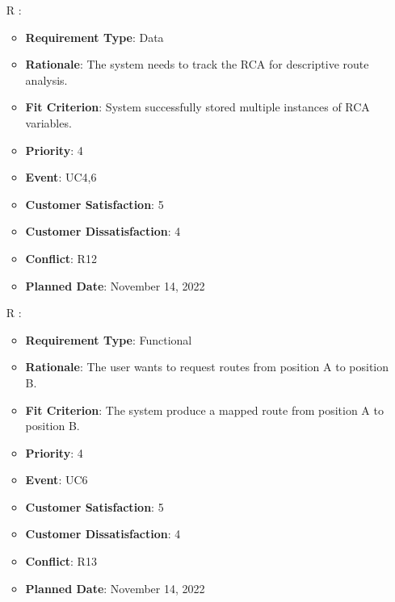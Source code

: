 \documentclass[12pt, titlepage]{article}
\newcounter{reqnum} %
\begin{document}
\begin{itemize}
\item[R\refstepcounter{reqnum}\thereqnum
\label{R_Inputs_1}:] 
\begin{itemize}
    \item \textbf{Requirement Type}: Data
    \item \textbf{Rationale}: The system needs to track the RCA for descriptive route analysis. 
    \item \textbf{Fit Criterion}: System successfully stored multiple instances of RCA variables. 
    \item \textbf{Priority}: 4
    \item \textbf{Event}: UC4,6
    \item \textbf{Customer Satisfaction}: 5
    \item \textbf{Customer Dissatisfaction}: 4
    \item \textbf{Conflict}: R12
    \item \textbf{Planned Date}: November 14, 2022
\end{itemize}

\item[R\refstepcounter{reqnum}\thereqnum
\label{R_Inputs_1}:] 
\begin{itemize}
    \item \textbf{Requirement Type}: Functional
    \item \textbf{Rationale}: The user wants to request routes from position A to position B.
    \item \textbf{Fit Criterion}: The system produce a mapped route from position A to position B.
    \item \textbf{Priority}: 4
    \item \textbf{Event}: UC6
    \item \textbf{Customer Satisfaction}: 5
    \item \textbf{Customer Dissatisfaction}: 4
    \item \textbf{Conflict}: R13
    \item \textbf{Planned Date}: November 14, 2022
\end{itemize}


\end{itemize}
\end{document}

